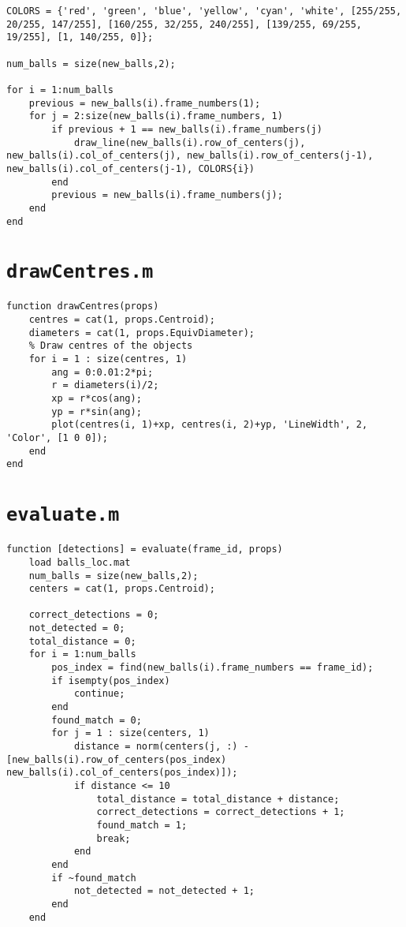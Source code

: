\documentclass[12pt,a4paper]{article}
\begin{document}
\begin{appendices}
\begin{verbatim}
COLORS = {'red', 'green', 'blue', 'yellow', 'cyan', 'white', [255/255, 20/255, 147/255], [160/255, 32/255, 240/255], [139/255, 69/255, 19/255], [1, 140/255, 0]};

num_balls = size(new_balls,2);

for i = 1:num_balls
    previous = new_balls(i).frame_numbers(1);
    for j = 2:size(new_balls(i).frame_numbers, 1)
        if previous + 1 == new_balls(i).frame_numbers(j)
            draw_line(new_balls(i).row_of_centers(j), new_balls(i).col_of_centers(j), new_balls(i).row_of_centers(j-1), new_balls(i).col_of_centers(j-1), COLORS{i})
        end
        previous = new_balls(i).frame_numbers(j);
    end
end
\end{verbatim}

\chapter{\texttt{drawCentres.m}}
\begin{verbatim}
function drawCentres(props)
    centres = cat(1, props.Centroid);
    diameters = cat(1, props.EquivDiameter);
    % Draw centres of the objects
    for i = 1 : size(centres, 1)
        ang = 0:0.01:2*pi; 
        r = diameters(i)/2;
        xp = r*cos(ang);
        yp = r*sin(ang);
        plot(centres(i, 1)+xp, centres(i, 2)+yp, 'LineWidth', 2, 'Color', [1 0 0]); 
    end
end
\end{verbatim}

\chapter{\texttt{evaluate.m}}
\begin{verbatim}
function [detections] = evaluate(frame_id, props)
    load balls_loc.mat
    num_balls = size(new_balls,2);
    centers = cat(1, props.Centroid);
    
    correct_detections = 0;
    not_detected = 0;
    total_distance = 0;
    for i = 1:num_balls
        pos_index = find(new_balls(i).frame_numbers == frame_id);
        if isempty(pos_index)
            continue;
        end
        found_match = 0;
        for j = 1 : size(centers, 1)
            distance = norm(centers(j, :) - [new_balls(i).row_of_centers(pos_index) new_balls(i).col_of_centers(pos_index)]);
            if distance <= 10
                total_distance = total_distance + distance;
                correct_detections = correct_detections + 1;
                found_match = 1;
                break;
            end
        end
        if ~found_match
            not_detected = not_detected + 1;
        end
    end
 

\end{verbatim}
\end{appendices}
\end{document}

